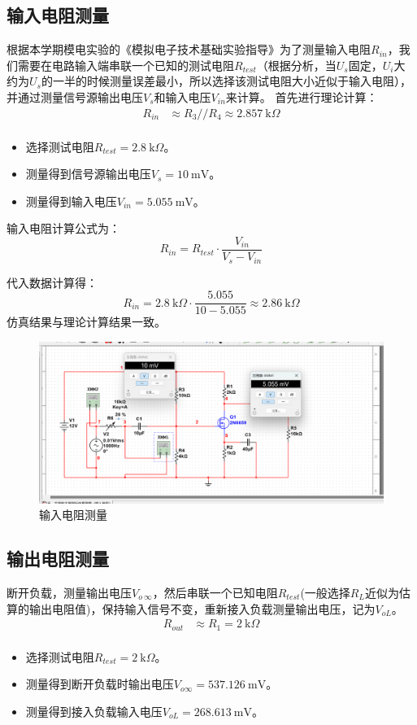 \documentclass[12p,UTF8]{article}
\begin{document}
\begin{spacing}{1.25}
\subsection{输入电阻测量}
根据本学期模电实验的《模拟电子技术基础实验指导》为了测量输入电阻$R_{in}$，我们需要在电路输入端串联一个已知的测试电阻$R_{test}$（根据分析，当$U_s$固定，$U_i$大约为$U_s$的一半的时候测量误差最小，所以选择该测试电阻大小近似于输入电阻），并通过测量信号源输出电压$V_{s}$和输入电压$V_{in}$来计算。
首先进行理论计算：
\begin{align*}
  R_{in} &\approx R_3//R_4 \approx 2.857\ \text{k}\Omega \\
\end{align*}
\begin{itemize}
  \item 选择测试电阻$R_{test} = 2.8\ \text{k}\Omega$。
  \item 测量得到信号源输出电压$V_{s} = 10\ \text{mV}$。
  \item 测量得到输入电压$V_{in} = 5.055\ \text{mV}$。
\end{itemize}

输入电阻计算公式为：
\[
R_{in} = R_{test} \cdot \frac{V_{in}}{V_s-V_{in}}
\]

代入数据计算得：
\[
R_{in} = 2.8\ \text{k}\Omega \cdot \frac{5.055}{10-5.055}  \approx 2.86\ \text{k}\Omega
\]
仿真结果与理论计算结果一致。
\FloatBarrier
\begin{figure}[H]
  \centering
  \includegraphics[width=1\linewidth]{4.png}
  \caption{输入电阻测量}
  \label{fig:circuit}
\end{figure}


\subsection{输出电阻测量}
断开负载，测量输出电压$V_{o\ \infty}$，然后串联一个已知电阻$R_{test}$(一般选择$R_L$近似为估算的输出电阻值)，保持输入信号不变，重新接入负载测量输出电压，记为$V_{oL}$。
\begin{align*}
  R_{out} &\approx R_1 = 2\ \text{k}\Omega \\
\end{align*}
\begin{itemize}
  \item 选择测试电阻$R_{test} = 2\ \text{k}\Omega$。
  \item 测量得到断开负载时输出电压$V_{o \infty} = 537.126\ \text{mV}$。
  \item 测量得到接入负载输入电压$V_{oL} = 268.613\ \text{mV}$。
\end{itemize}


\end{spacing}
\end{document}
